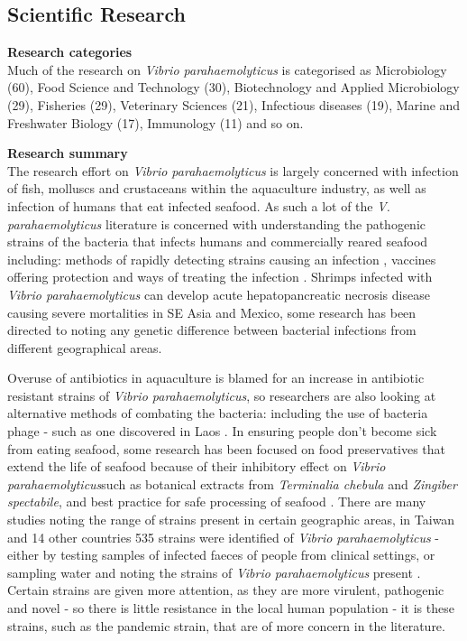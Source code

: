 \documentclass[openany]{book}
\theoremstyle{definition}
\theoremstyle{definition}
\theoremstyle{definition}
\theoremstyle{remark}
\begin{document}
\hypertarget{scientific-research-9}{%
\subsection{Scientific Research}\label{scientific-research-9}}

\textbf{Research categories}\\
Much of the research on \emph{Vibrio parahaemolyticus} is categorised as
Microbiology (60), Food Science and Technology (30), Biotechnology and
Applied Microbiology (29), Fisheries (29), Veterinary Sciences (21),
Infectious diseases (19), Marine and Freshwater Biology (17), Immunology
(11) and so on.

\textbf{Research summary}\\
The research effort on \emph{Vibrio parahaemolyticus} is largely
concerned with infection of fish, molluscs and crustaceans within the
aquaculture industry, as well as infection of humans that eat infected
seafood. As such a lot of the \emph{V. parahaemolyticus} literature is
concerned with understanding the pathogenic strains of the bacteria that
infects humans and commercially reared seafood including: methods of
rapidly detecting strains causing an infection , vaccines offering
protection and ways of treating the infection
\citep{RAHMAN_2006, Hu_2011}. Shrimps infected with \emph{Vibrio
parahaemolyticus} can develop acute hepatopancreatic necrosis disease
causing severe mortalities in SE Asia and Mexico, some research has been
directed to noting any genetic difference between bacterial infections
from different geographical areas.

Overuse of antibiotics in aquaculture is blamed for an increase in
antibiotic resistant strains of \emph{Vibrio parahaemolyticus}, so
researchers are also looking at alternative methods of combating the
bacteria: including the use of bacteria phage - such as one discovered
in Laos \citep{Elmahdi_2016, Higa_1999}. In ensuring people don't become
sick from eating seafood, some research has been focused on food
preservatives that extend the life of seafood because of their
inhibitory effect on \emph{Vibrio parahaemolyticus}such as botanical
extracts from \emph{Terminalia chebula} \citep{Kaewmane_2012} and
\emph{Zingiber spectabile}, and best practice for safe processing of
seafood \citep{Sivasothy_2013, Boonyawantang_2012}. There are many
studies noting the range of strains present in certain geographic areas,
in Taiwan and 14 other countries 535 strains were identified of
\emph{Vibrio parahaemolyticus} - either by testing samples of infected
faeces of people from clinical settings, or sampling water and noting
the strains of \emph{Vibrio parahaemolyticus} present
\citep{Wong_2007, Wootipoom_2007}. Certain strains are given more
attention, as they are more virulent, pathogenic and novel - so there is
little resistance in the local human population - it is these strains,
such as the pandemic strain, that are of more concern in the literature.
\end{document}
